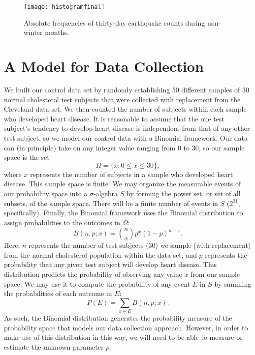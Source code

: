 \documentclass{amsart}
\begin{document}
\begin{figure}
\centering
\texttt{[image: histogramfinal]}
\caption{Absolute frequencies of thirty-day earthquake counts during non-winter months.\label{F:absoluteFrequencies}}
\end{figure}

\section{A Model for Data Collection}
We built our control data set by randomly establishing 50 different samples of 30 normal cholesterol test subjects that were collected with replacement from the Cleveland data set. We then counted the number of subjects within each sample who developed heart disease. It is reasonable to assume that the one test subject's tendency to develop heart disease is independent from that of any other test subject, so we model our control data with a Binomial framework. Our data can (in principle) take on any integer value ranging from 0 to 30, so our sample space is the set $$\Omega=\{x: 0\le x\le 30\},$$  where $x$ represents the number of subjects in a sample who developed heart disease. This sample space is finite. We may organize the measurable events of our probability space into a $\sigma$-algebra $S$ by forming the power set, or set of all subsets, of the sample space.  There will be a finite number of events in $S$ ($2^{31}$, specifically). Finally, the Binomial framework uses the Binomial distribution to assign probabilities to the outcomes in $\Omega$:
\[
B(n,p;x)=\binom{n}{x}p^x(1-p)^{n-x}.
\]
Here, $n$ represents the number of test subjects (30) we sample (with replacement) from the normal cholesterol population within the data set, and $p$ represents the probability that any given test subject will develop heart disease. This distribution predicts the probability of observing any value $x$ from our sample space. We may use it to compute the probability of any event $E$ in $S$ by summing the probabilities of each outcome in $E$:
\[
P(E)=\sum_{x\in E} B(n,p;x).
\]
As such, the Binomial distribution generates the probability measure of the probability space that models our data collection approach. However, in order to make use of this distribution in this way, we will need to be able to measure or estimate the unknown parameter $p$.
\end{document}

